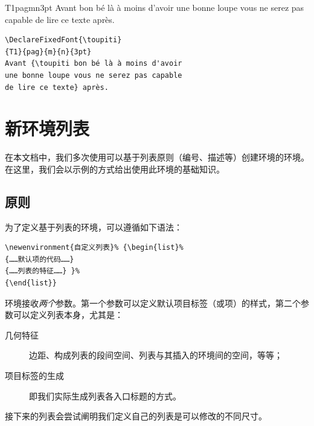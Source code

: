 \begin{codelist}[9.15]{
\DeclareFixedFont{\toupiti}
{T1}{pag}{m}{n}{3pt}
Avant {\toupiti bon bé là à moins d'avoir
une bonne loupe vous ne serez pas capable
de lire ce texte} après.
}\begin{verbatim}
\DeclareFixedFont{\toupiti}
{T1}{pag}{m}{n}{3pt}
Avant {\toupiti bon bé là à moins d'avoir
une bonne loupe vous ne serez pas capable
de lire ce texte} après.
\end{verbatim}
\end{codelist}

\section{新环境列表}

在本文档中，我们多次使用可以基于列表原则（编号、描述等）创建环境的环境。在这里，我们会以示例的方式给出使用此环境的基础知识。

\subsection{原则}

为了定义基于列表的环境，可以遵循如下语法：

\begin{dmd}
\begin{verbatim}
\newenvironment{自定义列表}% {\begin{list}%
{……默认项的代码……}
{……列表的特征……} }%
{\end{list}}
\end{verbatim}
\end{dmd}

环境接收\emph{两个}参数。第一个参数可以定义默认项目标签（或项）的样式，第二个参数可以定义列表本身，尤其是：

\begin{description}
    \item[几何特征] 边距、构成列表的段间空间、列表与其插入的环境间的空间，等等；
    \item[项目标签的生成] 即我们实际生成列表各入口标题的方式。
\end{description}

接下来的列表会尝试阐明我们定义自己的列表是可以修改的不同尺寸。

\newenvironment{listetest}{\begin{list}{}{%
    \setlength{\labelwidth}{70pt}%
    \setlength{\labelsep}{30pt}%
    \setlength{\itemindent}{15pt}%
    \setlength{\leftmargin}{100pt}%
    \setlength{\rightmargin}{10pt}%
    \setlength{\listparindent}{20pt}%
    \renewcommand{\makelabel}[1]{\textsf{##1}}
  }
}
{\end{list}}

